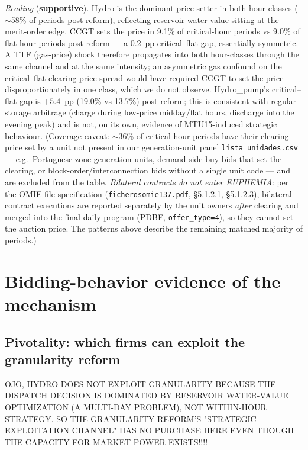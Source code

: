 \documentclass[11pt,a4paper]{article}
\begin{document}
\textit{Reading} (\textbf{supportive}). Hydro is the dominant price-setter in both hour-classes ($\sim$58\% of periods post-reform), reflecting reservoir water-value sitting at the merit-order edge. CCGT sets the price in 9.1\% of critical-hour periods vs 9.0\% of flat-hour periods post-reform --- a 0.2~pp critical--flat gap, essentially symmetric. A TTF (gas-price) shock therefore propagates into both hour-classes through the same channel and at the same intensity; an asymmetric gas confound on the critical--flat clearing-price spread would have required CCGT to set the price disproportionately in one class, which we do not observe. Hydro\_pump's critical--flat gap is $+5.4$~pp (19.0\% vs 13.7\%) post-reform; this is consistent with regular storage arbitrage (charge during low-price midday/flat hours, discharge into the evening peak) and is not, on its own, evidence of MTU15-induced strategic behaviour. (Coverage caveat: $\sim$36\% of critical-hour periods have their clearing price set by a unit not present in our generation-unit panel \texttt{lista\_unidades.csv} --- e.g.\ Portuguese-zone generation units, demand-side buy bids that set the clearing, or block-order/interconnection bids without a single unit code --- and are excluded from the table. \emph{Bilateral contracts do not enter EUPHEMIA}: per the OMIE file specification (\texttt{ficherosomie137.pdf}, §5.1.2.1, §5.1.2.3), bilateral-contract executions are reported separately by the unit owners \emph{after} clearing and merged into the final daily program (PDBF, \texttt{offer\_type=4}), so they cannot set the auction price. The patterns above describe the remaining matched majority of periods.)

\section{Bidding-behavior evidence of the mechanism}\label{sec:bid_evidence}

\subsection{Pivotality: which firms can exploit the granularity reform}\label{sec:bid_evidence:pivotality}

OJO, HYDRO DOES NOT EXPLOIT GRANULARITY BECAUSE THE DISPATCH DECISION IS DOMINATED BY RESERVOIR WATER-VALUE OPTIMIZATION (A MULTI-DAY PROBLEM), NOT WITHIN-HOUR STRATEGY. SO THE GRANULARITY REFORM'S "STRATEGIC EXPLOITATION CHANNEL" HAS NO PURCHASE HERE EVEN THOUGH THE CAPACITY FOR MARKET POWER EXISTS!!!!
\end{document}
